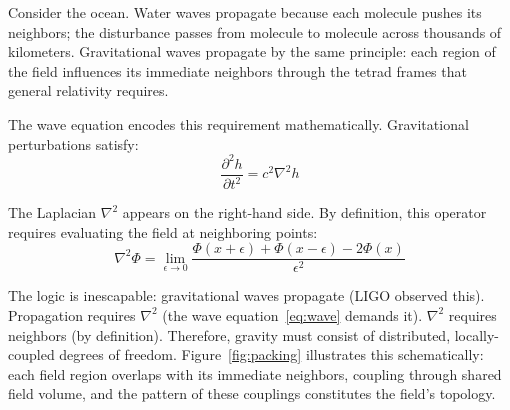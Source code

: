 \documentclass[aps,prd,preprint,superscriptaddress,showpacs,preprintnumbers,amsmath,amssymb,nofootinbib]{revtex4-2}
\begin{document}
Consider the ocean. Water waves propagate because each molecule pushes its neighbors; the disturbance passes from molecule to molecule across thousands of kilometers. Gravitational waves propagate by the same principle: each region of the field influences its immediate neighbors through the tetrad frames that general relativity requires.

The wave equation encodes this requirement mathematically. Gravitational perturbations satisfy:
\begin{equation}
\frac{\partial^2 h}{\partial t^2} = c^2 \nabla^2 h
\label{eq:wave}
\end{equation}

The Laplacian $\nabla^2$ appears on the right-hand side. By definition, this operator requires evaluating the field at neighboring points:
\begin{equation}
\nabla^2 \Phi = \lim_{\epsilon \to 0} \frac{\Phi(x+\epsilon) + \Phi(x-\epsilon) - 2\Phi(x)}{\epsilon^2}
\label{eq:laplacian}
\end{equation}

The logic is inescapable: gravitational waves propagate (LIGO observed this). Propagation requires $\nabla^2$ (the wave equation~\eqref{eq:wave} demands it). $\nabla^2$ requires neighbors (by definition). Therefore, gravity must consist of distributed, locally-coupled degrees of freedom. Figure~\ref{fig:packing} illustrates this schematically: each field region overlaps with its immediate neighbors, coupling through shared field volume, and the pattern of these couplings constitutes the field's topology.
\end{document}
